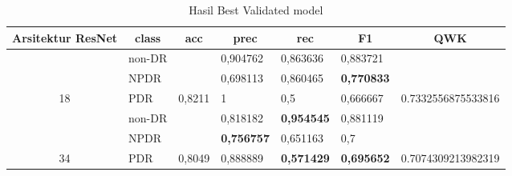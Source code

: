 \begin{table}[hbtp]
	\begin{center}
		\caption{Hasil Best Validated model}
		\label{tb:HasilValDefault}
		\begin{tabular}{|c|l|c|l|l|l|c|}
			\hline
			\rowcolor[HTML]{C0C0C0} 
			Arsitektur ResNet   & \multicolumn{1}{c|}{\cellcolor[HTML]{C0C0C0}class} & acc                      & \multicolumn{1}{c|}{\cellcolor[HTML]{C0C0C0}prec} & \multicolumn{1}{c|}{\cellcolor[HTML]{C0C0C0}rec} & \multicolumn{1}{c|}{\cellcolor[HTML]{C0C0C0}F1} & QWK                                  \\ \hline
			& non-DR                                             &                          & 0,904762                                          & 0,863636                                         & 0,883721                                        &                                      \\ \cline{2-2} \cline{4-6}
			& NPDR                                               &                          & 0,698113                                          & 0,860465                                         & \textbf{0,770833}                               &                                      \\ \cline{2-2} \cline{4-6}
			\multirow{-3}{*}{18}  & PDR                                                & \multirow{-3}{*}{0,8211} & 1                                                 & 0,5                                              & 0,666667                                        & \multirow{-3}{*}{0.7332556875533816} \\ \hline
			& non-DR                                             &                          & 0,818182                                          & \textbf{0,954545}                                & 0,881119                                        &                                      \\ \cline{2-2} \cline{4-6}
			& NPDR                                               &                          & \textbf{0,756757}                                 & 0,651163                                         & 0,7                                             &                                      \\ \cline{2-2} \cline{4-6}
			\multirow{-3}{*}{34}  & PDR                                                & \multirow{-3}{*}{0,8049} & 0,888889                                          & \textbf{0,571429}                                & \textbf{0,695652}                                        & \multirow{-3}{*}{0.7074309213982319} \\ \hline

\end{tabular}
\end{center}
\end{table}
